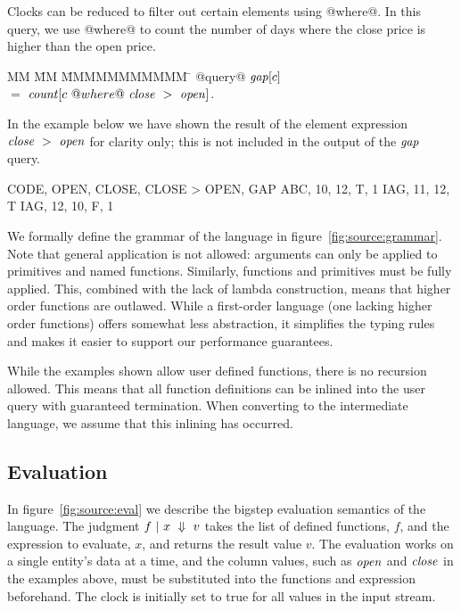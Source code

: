Clocks can be reduced to filter out certain elements using @where@.
In this query, we use @where@ to count the number of days where the close price is higher than the open price.
\begin{tabbing}
MM \= MM \= MMMMMMMMMMM \= \kill
@query@ 
$\mathit{gap}[c]$                                        \\
 \> $=$  \> $\mathit{count}[c~@where@~\mathit{close}~>~\mathit{open}]$.       \\
\end{tabbing}

In the example below we have shown the result of the element expression $\mathit{close}~>~\mathit{open}$ for clarity only; this is not included in the output of the $\mathit{gap}$ query.
\begin{code}
CODE, OPEN, CLOSE, CLOSE > OPEN, GAP
ABC,    10,    12,            T,   1
IAG,    11,    12,            T
IAG,    12,    10,            F,   1
\end{code}


We formally define the grammar of the language in figure~\ref{fig:source:grammar}.
Note that general application is not allowed: arguments can only be applied to primitives and named functions.
Similarly, functions and primitives must be fully applied.
This, combined with the lack of lambda construction, means that higher order functions are outlawed.
While a first-order language (one lacking higher order functions) offers somewhat less abstraction, it simplifies the typing rules and makes it easier to support our performance guarantees.

While the examples shown allow user defined functions, there is no recursion allowed.
This means that all function definitions can be inlined into the user query with guaranteed termination.
When converting to the intermediate language, we assume that this inlining has occurred.

\subsection{Evaluation}



In figure~\ref{fig:source:eval} we describe the bigstep evaluation semantics of the language.
The judgment $f ~|~ x ~\Downarrow~ v$ takes the list of defined functions, $f$, and the expression to evaluate, $x$, and returns the result value $v$.
The evaluation works on a single entity's data at a time, and the column values, such as $\mathit{open}$ and $\mathit{close}$ in the examples above, must be substituted into the functions and expression beforehand.
The clock is initially set to true for all values in the input stream.

